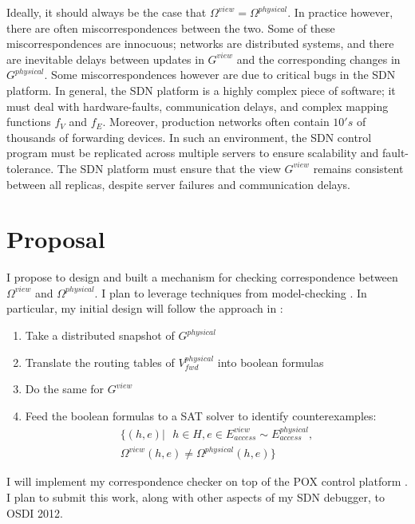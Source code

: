 \documentclass{sig-alternate-10pt}
\begin{document}
Ideally, it should always be the case that $\Omega^{view} = \Omega^{physical}$.
In practice however, there are often miscorrespondences between the two. Some
of these miscorrespondences are innocuous; networks are distributed systems,
and there are inevitable delays between updates in $G^{view}$ and the
corresponding changes in $G^{physical}$. Some miscorrespondences however are
due to critical bugs in the SDN platform. In general, the SDN platform is a
highly complex piece of software; it must deal with hardware-faults,
communication delays, and complex mapping functions $f_{V}$ and $f_{E}$. 
Moreover, production networks often contain $10's$ of thousands of
forwarding devices. In such an environment, the SDN control program must be
replicated across multiple servers to ensure scalability and fault-tolerance. 
The SDN platform must ensure that the view $G^{view}$ remains consistent
between all replicas, despite server failures and communication delays.

\section{Proposal}

I propose to design and built a mechanism for checking 
correspondence between $\Omega^{view}$ and $\Omega^{physical}$.
I plan to leverage techniques from model-checking \cite{symbolicmodel}.
In particular, my initial design will follow the approach in \cite{Anteater}:
\begin{enumerate}
\item Take a distributed snapshot of $G^{physical}$ \cite{distributedsnapshots}
\item Translate the routing tables of $V_{fwd}^{physical}$ into boolean
formulas
\item Do the same for $G^{view}$
\item Feed the boolean formulas to a SAT solver to identify
counterexamples:
\begin{align*}
 \{ (h,e) |\text{ } h \in H, e \in E^{view}_{access} \sim
 E^{physical}_{access}, \\
 \Omega^{view}(h,e) \neq  \Omega^{physical}(h,e) \}
\end{align*}
\end{enumerate}

I will implement my correspondence checker on top of the POX control platform
\cite{POX}.
I plan to submit this work, along with other aspects of my SDN debugger, to
OSDI 2012.

\scriptsize



%
\end{document}
